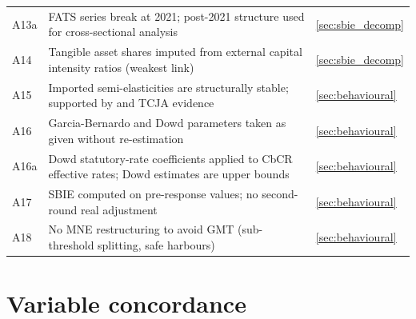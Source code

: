 \documentclass[11pt,a4paper]{article}
\begin{document}
\begin{longtable}{@{}lp{10cm}l@{}}
A13a & FATS series break at 2021; post-2021 structure used for cross-sectional analysis & \ref{sec:sbie_decomp} \\
A14 & Tangible asset shares imputed from external capital intensity ratios (weakest link) & \ref{sec:sbie_decomp} \\
A15 & Imported semi-elasticities are structurally stable; supported by \citeauthor{beer2020} and TCJA evidence & \ref{sec:behavioural} \\
A16 & Garcia-Bernardo and Dowd parameters taken as given without re-estimation & \ref{sec:behavioural} \\
A16a & Dowd statutory-rate coefficients applied to CbCR effective rates; Dowd estimates are upper bounds & \ref{sec:behavioural} \\
A17 & SBIE computed on pre-response values; no second-round real adjustment & \ref{sec:behavioural} \\
A18 & No MNE restructuring to avoid GMT (sub-threshold splitting, safe harbours) & \ref{sec:behavioural} \\
\end{longtable}


\newpage
\section{Variable concordance}\label{app:concordance}
\setcounter{table}{0}
\end{document}
